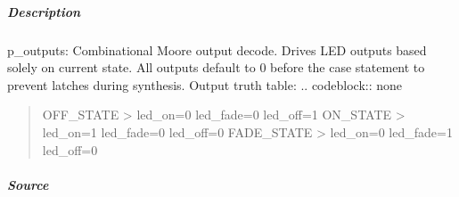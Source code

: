 \documentclass[letterpaper,10pt,english]{sphinxmanual}
\begin{document}
\subparagraph{Description}
\label{\detokenize{modules/blinky/processes/p_outputs:description}}
\sphinxAtStartPar
p\_outputs: Combinational Moore output decode.
Drives LED outputs based solely on current state.
All outputs default to 0 before the case statement to
prevent latches during synthesis.
Output truth table:
.. code\sphinxhyphen{}block:: none
\begin{quote}

\sphinxAtStartPar
OFF\_STATE  \sphinxhyphen{}\textgreater{} led\_on=0 led\_fade=0 led\_off=1
ON\_STATE   \sphinxhyphen{}\textgreater{} led\_on=1 led\_fade=0 led\_off=0
FADE\_STATE \sphinxhyphen{}\textgreater{} led\_on=0 led\_fade=1 led\_off=0
\end{quote}

\noindent{}


\subparagraph{Source}
\label{\detokenize{modules/blinky/processes/p_outputs:source}}
\begin{sphinxVerbatim}[commandchars=\\\{\}]

\end{sphinxVerbatim}
\end{document}
